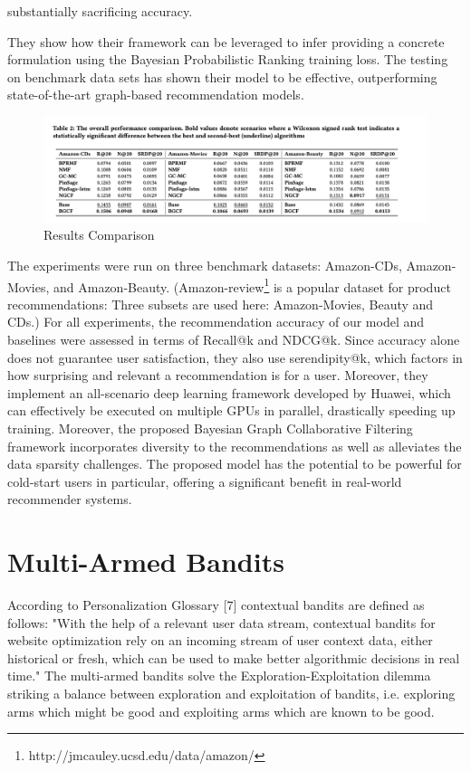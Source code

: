 substantially sacrificing accuracy.

They show how their framework can be leveraged to infer providing a concrete formulation using the Bayesian Probabilistic Ranking training loss. The testing on benchmark data sets has shown their model to be effective, outperforming state-of-the-art graph-based recommendation models. 

\begin{figure}[hh!]
    \centering
    \includegraphics[width=125mm]{BGCF_results_comparison.png}
    \caption{Results Comparison
    \label{overflow}}
\end{figure}

The experiments were run on three benchmark datasets: Amazon-CDs, Amazon-Movies, and Amazon-Beauty. (Amazon-review\footnote{ http://jmcauley.ucsd.edu/data/amazon/} is a popular dataset for product recommendations: Three subsets are used here: Amazon-Movies, Beauty and CDs.) For all experiments, the recommendation accuracy of our model and baselines were assessed in terms of Recall@k and NDCG@k. Since accuracy alone does not guarantee user satisfaction, they also use serendipity@k, which factors in how surprising and relevant a recommendation is for a user. Moreover, they implement an all-scenario deep learning framework developed by Huawei, which can effectively be executed on multiple GPUs in parallel, drastically speeding up training.  Moreover, the proposed Bayesian Graph Collaborative Filtering framework incorporates diversity to the recommendations as well as alleviates the data sparsity challenges. The proposed model has the potential to be powerful for cold-start users in particular, offering a significant benefit in real-world recommender systems. 

\chapter{Multi-Armed Bandits}
According to Personalization Glossary [7] contextual bandits are defined as follows: "With the help of a relevant user data stream, contextual bandits for website optimization rely on an incoming stream of user context data, either historical or fresh, which can be used to make better algorithmic decisions in real time."
The multi-armed bandits solve the Exploration-Exploitation dilemma striking a balance between exploration and exploitation of bandits, i.e. exploring arms which might be good and exploiting arms which are known to be good.

